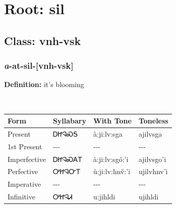 \needspace{4in}
\section*{Root: sil}
\nopagebreak
{}
\needspace{3in}
\subsection*{Class: vnh-vsk}
\nopagebreak
\needspace{2in}
\subsubsection*{\textit{a}{-}at{-}\textbf{sil}{-}[vnh-vsk]}
\nopagebreak
\textbf{Definition: } it{\textquoteright}s blooming
\\[0.5em]
\begin{tabularx}{\textwidth}{l X X X}%
\toprule%
\textbf{Form}&\textbf{Syllabary}&\textbf{With Tone}&\textbf{Toneless}\\%
\midrule%
Present&ᎠᏥᎸᏍᎦ&à:ji:lv:sga&ajilvsga\\%
1st Present&{-}{-}{-}&{-}{-}{-}&{-}{-}{-}\\%
Imperfective&ᎠᏥᎸᏍᎪᎢ&à:ji:lv:sgó:’i&ajilvsgo’i\\%
Perfective&ᎤᏥᎸᏅᎢ&ù:ji:lv:hnv̌:’i&ujilvhnv’i\\%
Imperative&{-}{-}{-}&{-}{-}{-}&{-}{-}{-}\\%
Infinitive&ᎤᏥᎸᏗ&u:jihldi&ujihldi\\%
\bottomrule%
\end{tabularx}
\\[1em]